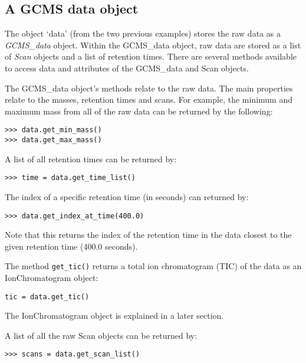 \subsection{A GCMS data object}


The object `data' (from the two previous examples) stores the raw data as a {\em
GCMS\_data} object. Within the GCMS\_data object, raw data are stored as a list
of {\em Scan} objects and a list of retention times.  There are several methods
available to access data and attributes of the GCMS\_data and Scan objects.

The GCMS\_data object's methods relate to the raw data. The main properties
relate to the masses, retention times and scans. For example, the
minimum and maximum mass from all of the raw data can be returned by the
following:

\begin{verbatim}
>>> data.get_min_mass()
>>> data.get_max_mass()
\end{verbatim}

A list of all retention times can be returned by:

\begin{verbatim}
>>> time = data.get_time_list()
\end{verbatim}

The index of a specific retention time (in seconds) can returned by:

\begin{verbatim}
>>> data.get_index_at_time(400.0)
\end{verbatim}

\noindent
Note that this returns the index of the retention time in the
data closest to the given retention time (400.0 seconds).

The method {\tt get\_tic()} returns a total ion chromatogram (TIC) of the data
as an IonChromatogram object:

\begin{verbatim}
tic = data.get_tic()
\end{verbatim}

\noindent
The IonChromatogram object is explained in a later section.

A list of all the raw Scan objects can be returned by:

\begin{verbatim}
>>> scans = data.get_scan_list()
\end{verbatim}

